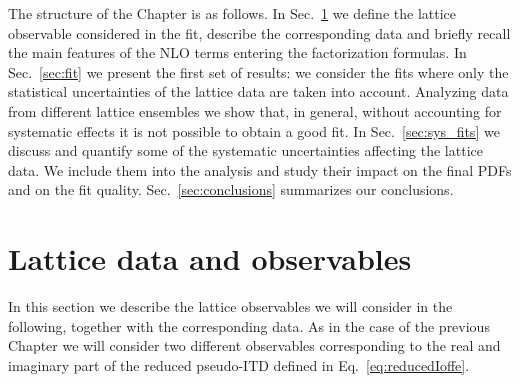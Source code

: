 \iffalse
In this article we extend the general strategy that has been developed within the {\tt NNPDF} framework and which allows us to systematically extract parton distributions from the available lattice data. In the implementation of this idea once the lattice data have reached some level of maturity in terms of precision and systematic effects, one could combine data from all pertinent lattice formalisms such as quasi-distributions ~\cite{Lin:2014zya,Chen:2016utp,Alexandrou:2015rja,Alexandrou:2016jqi, Monahan:2016bvm, Zhang:2017bzy, Alexandrou:2017huk, Green:2017xeu,Alexandrou:2018pbm,Chen:2018xof,Alexandrou:2018eet,Lin:2018qky,Fan:2018dxu,Liu:2018hxv,Alexandrou:2019lfo,Izubuchi:2019lyk,Green:2020xco,Chai:2020nxw,Lin:2020ssv,Alexandrou:2020zbe}
and pseudo-distributions ~\cite{Orginos:2017kos,Karpie:2018zaz,Joo:2019jct,Joo:2019bzr,Joo:2020spy,Bhat:2020ktg,Fan:2020cpa,Gao:2020ito}.
One can also include results from the so-called ``Good Lattice Cross-Sections'' (LCS) approach,
which is described in~\cite{Ma:2017pxb} and represents a general framework, where one computes matrix elements that can be factorized into PDFs at short distances. 
Papers~\cite{Bali:2017gfr,Bali:2018spj,Sufian:2019bol,Bali:2019ecy, Sufian:2020vzb} describe implementations of the latter formalism.
Clearly a global analysis only makes sense after having scrutinised each set of data individually,
and having understood the systematics that affect them.
\fi
The structure of the Chapter is as  follows.  In Sec.~\ref{sec:data} we define the lattice observable considered in the fit,
describe the corresponding data and  briefly recall the main features of the NLO terms entering the factorization formulas.
In Sec.~\ref{sec:fit} we present the first set of results:
we consider the  fits where only the statistical uncertainties of the lattice data are taken into account.
Analyzing data from different lattice ensembles we 
show that, in general, without accounting for systematic effects  it is not possible to obtain a good fit.
In Sec.~\ref{sec:sys_fits} we discuss and quantify some of the systematic uncertainties affecting
the lattice data.  We  include them into the analysis and  study their impact on the final PDFs and on the fit quality.
Sec.~\ref{sec:conclusions} summarizes our conclusions. 


\section{Lattice data and observables}
\label{sec:data}

In this section we describe the lattice observables we will consider in the following, together with the corresponding data.
As in the case of the previous Chapter we will consider two different observables corresponding to 
the real and imaginary part of the reduced pseudo-ITD defined in Eq.~\eqref{eq:reducedIoffe}.
 
